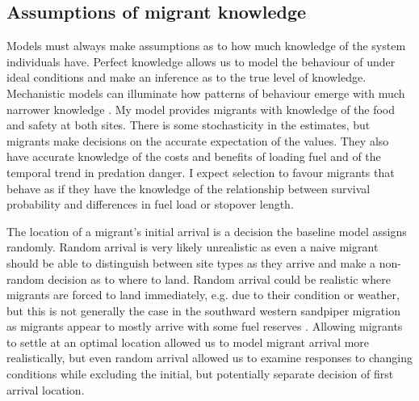 \subsection*{Assumptions of migrant knowledge}

Models must always make assumptions as to how much knowledge of the system individuals have. Perfect knowledge allows us to model the behaviour of under ideal conditions and make an inference as to the true level of knowledge. Mechanistic models can illuminate how patterns of behaviour emerge with much narrower knowledge \citep{Bracis2018}. My model provides migrants with knowledge of the food and safety at both sites. There is some stochasticity in the estimates, but migrants make decisions on the accurate expectation of the values. They also have accurate knowledge of the costs and benefits of loading fuel and of the temporal trend in predation danger. I expect selection to favour migrants that behave as if they have the knowledge of the relationship between survival probability and differences in fuel load or stopover length.

The location of a migrant's initial arrival is a decision the baseline model assigns randomly. Random arrival is very likely unrealistic as even a naive migrant should be able to distinguish between site types as they arrive and make a non-random decision as to where to land. Random arrival could be realistic where migrants are forced to land immediately, e.g. due to their condition or weather, but this is not generally the case in the southward western sandpiper migration as migrants appear to mostly arrive with some fuel reserves \citep{Butler1987}. Allowing migrants to settle at an optimal location allowed us to model migrant arrival more realistically, but even random arrival allowed us to examine responses to changing conditions while excluding the initial, but potentially separate decision of first arrival location.




